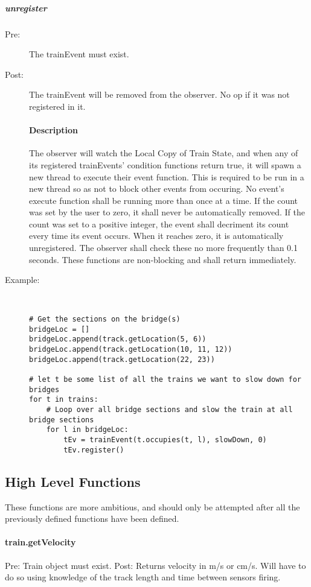 \documentclass[a4paper,11pt,notitlepage]{article}
\def\LC{Local Copy of Train State\xspace}
\begin{document}
\subparagraph{unregister}
\begin{description}
\item[\hspace{1cm}Pre:] The trainEvent must exist.
\item[\hspace{1cm}Post:] The trainEvent will be removed from the observer. No op if it was not registered in it.
\paragraph{Description}
The observer will watch the \LC, and when any of its registered trainEvents' condition functions return true, it will spawn a new thread to execute their event function. This is required to be run in a new thread so as not to block other events from occuring. No event's execute function shall be running more than once at a time. If the count was set by the user to zero, it shall never be automatically removed. If the count was set to a positive integer, the event shall decriment its count every time its event occurs. When it reaches zero, it is automatically unregistered. The observer shall check these no more frequently than 0.1 seconds.
These functions are non-blocking and shall return immediately.
\item[\hspace{1cm}Example:]
\begin{verbatim}


# Get the sections on the bridge(s)
bridgeLoc = []
bridgeLoc.append(track.getLocation(5, 6))
bridgeLoc.append(track.getLocation(10, 11, 12))
bridgeLoc.append(track.getLocation(22, 23))

# let t be some list of all the trains we want to slow down for bridges
for t in trains:
    # Loop over all bridge sections and slow the train at all bridge sections
    for l in bridgeLoc:
        tEv = trainEvent(t.occupies(t, l), slowDown, 0)
        tEv.register()
\end{verbatim}
\end{description}


\subsection{High Level Functions}
These functions are more ambitious, and should only be attempted after all the previously defined functions have been defined.
\paragraph{train.getVelocity} Pre: Train object must exist. Post: Returns velocity in m/s or cm/s. Will have to do so using knowledge of the track length and time between sensors firing.
\end{document}
